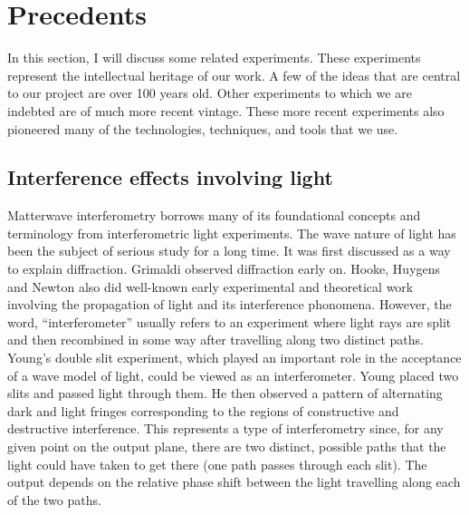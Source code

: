 \section{Precedents}
In this section, I will discuss some related experiments. These experiments represent the intellectual heritage of our work.
A few of the ideas that are central to our project are over 100 years old. Other experiments to which we are indebted are of much more recent vintage. These more recent experiments also pioneered many of the technologies, techniques, and tools that we use. 
 \subsection{Interference effects involving light}
Matterwave interferometry borrows many of its foundational concepts and terminology from interferometric light experiments.
The wave nature of light has been the subject of serious study for a long time. It was first discussed as a way to explain diffraction.
Grimaldi observed diffraction early on. Hooke, Huygens and Newton also did well-known early experimental and theoretical work involving the propagation of light and its interference phonomena. 
However, the word, ``interferometer'' usually refers to an experiment where light rays are split and then recombined in some way after travelling along two distinct paths. 
Young's double slit experiment, which played an important role in the acceptance of a wave model of light, could be viewed as an interferometer. 
Young placed two slits and passed light through them. He then observed a pattern of alternating dark and light fringes corresponding to the regions of constructive and destructive interference. This represents a type of interferometry since, for any given point on the output plane, there are two distinct, possible paths that the light could have taken to get there (one path passes through each slit). The output depends on the relative phase shift between the light travelling along each of the two paths. 

